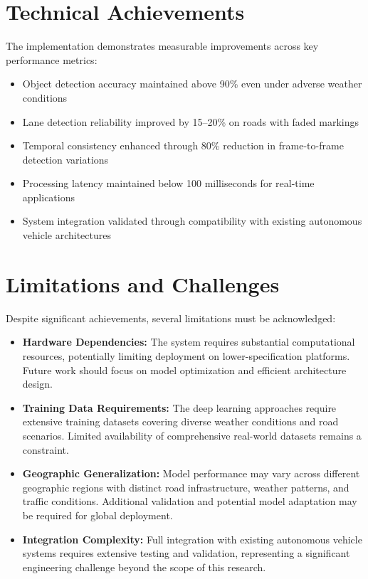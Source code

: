 \section{Technical Achievements}
The implementation demonstrates measurable improvements across key performance metrics:
\begin{itemize}
    \item Object detection accuracy maintained above 90\% even under adverse weather conditions
    \item Lane detection reliability improved by 15--20\% on roads with faded markings
    \item Temporal consistency enhanced through 80\% reduction in frame-to-frame detection variations
    \item Processing latency maintained below 100 milliseconds for real-time applications
    \item System integration validated through compatibility with existing autonomous vehicle architectures
\end{itemize}

\section{Limitations and Challenges}
Despite significant achievements, several limitations must be acknowledged:
\begin{itemize}
    \item \textbf{Hardware Dependencies:} The system requires substantial computational resources, potentially limiting deployment on lower-specification platforms. Future work should focus on model optimization and efficient architecture design.

    \item \textbf{Training Data Requirements:} The deep learning approaches require extensive training datasets covering diverse weather conditions and road scenarios. Limited availability of comprehensive real-world datasets remains a constraint.

    \item \textbf{Geographic Generalization:} Model performance may vary across different geographic regions with distinct road infrastructure, weather patterns, and traffic conditions. Additional validation and potential model adaptation may be required for global deployment.

    \item \textbf{Integration Complexity:} Full integration with existing autonomous vehicle systems requires extensive testing and validation, representing a significant engineering challenge beyond the scope of this research.
\end{itemize}

